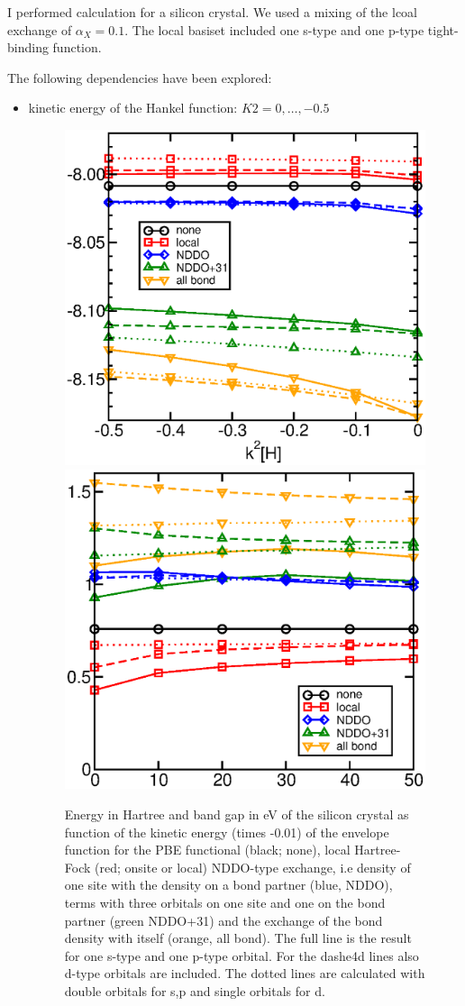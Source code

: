 \documentclass[11pt,a4paper]{report}
\begin{document}
I performed calculation for a silicon crystal. We used a mixing of the
lcoal exchange of $\alpha_X=0.1$. The local basiset included one
s-type and one p-type tight-binding function.

The following dependencies have been explored:
\begin{itemize}
%
\item kinetic energy of the Hankel function: $K2=0,\ldots,-0.5$
\begin{figure}[h!]
\begin{center}
\includegraphics[width=0.4\linewidth,clip=true]{Figs/Eofk2si/eofk2.eps}
\includegraphics[width=0.4\linewidth,clip=true]{Figs/Gapofk2si/gapofk2.eps}
\end{center}
\caption{Energy in Hartree and band gap in eV of the silicon crystal
  as function of the kinetic energy (times -0.01) of the envelope
  function for the PBE functional (black; none), local Hartree-Fock
  (red; onsite or local) NDDO-type exchange, i.e density of one site
  with the density on a bond partner (blue, NDDO), terms with three
  orbitals on one site and one on the bond partner (green NDDO+31) and
  the exchange of the bond density with itself (orange, all bond).
  The full line is the result for one s-type and one p-type
  orbital. For the dashe4d lines also d-type orbitals are
  included. The dotted lines are calculated with double orbitals for
  s,p and single orbitals for d.}
\end{figure}
%

\end{itemize}
\end{document}
